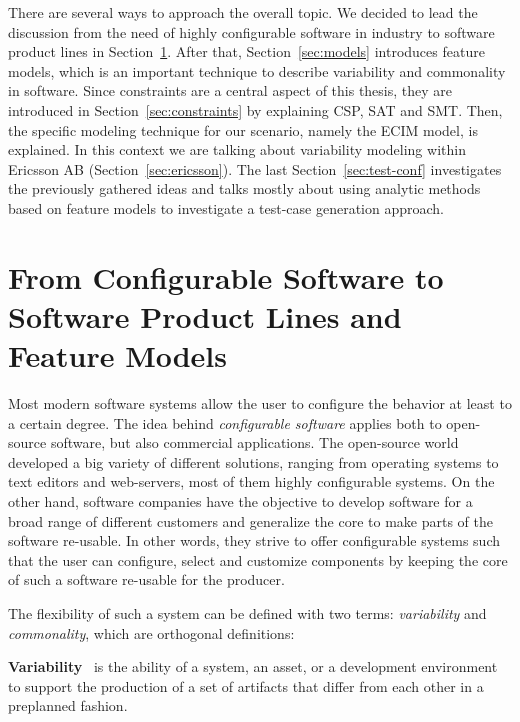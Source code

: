 There are several ways to approach the overall topic. We decided to lead the discussion from the need of highly configurable software in industry to software product lines in Section~\ref{sec:configurable}. After that, Section~\ref{sec:models} introduces feature models, which is an important technique to describe variability and commonality in software. Since constraints are a central aspect of this thesis, they are introduced in Section~\ref{sec:constraints} by explaining CSP, SAT and SMT. Then, the specific modeling technique for our scenario, namely the ECIM model, is explained. In this context we are talking about variability modeling within Ericsson AB (Section~\ref{sec:ericsson}). The last Section~\ref{sec:test-conf} investigates the previously gathered ideas and talks mostly about using analytic methods based on feature models to investigate a test-case generation approach.

\section{From Configurable Software to Software Product Lines and Feature Models}\label{sec:configurable}

Most modern software systems allow the user to configure the behavior at least to a certain degree. The idea behind \emph{configurable software} applies both to open-source software, but also commercial applications. The open-source world developed a big variety of different solutions, ranging from operating systems to text editors and web-servers, most of them highly configurable systems. 
On the other hand, software companies have the objective to develop software for a broad range of different customers and  generalize the core to make parts of the software re-usable. In other words, they strive to offer configurable systems such that the user can configure, select and customize components by keeping the core of such a software re-usable for the producer. 

The flexibility of such a system can be defined with two terms: \emph{variability} and \emph{commonality}, which are orthogonal definitions:

\begin{definition}
\textbf{Variability}~\cite{variability} is the ability of a system, an asset, or a development environment to support the 
production of a set of artifacts that differ from each other in a preplanned fashion.
\end{definition}


